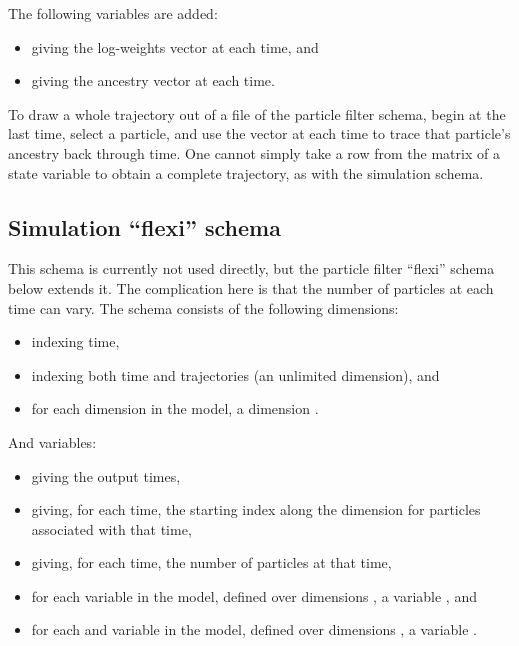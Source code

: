 The following variables are added:
\begin{itemize}
\item {} giving the log-weights vector at each time, and
\item {} giving the ancestry vector at each time.
\end{itemize}

\begin{tip}
To draw a whole trajectory out of a file of the particle filter schema, begin
at the last time, select a particle, and use the  vector at
each time to trace that particle's ancestry back through time. One cannot
simply take a row from the matrix of a state variable to obtain a complete
trajectory, as with the simulation schema.
\end{tip}

\subsection{Simulation ``flexi'' schema}

This schema is currently not used directly, but the particle filter ``flexi''
schema below extends it. The complication here is that the number of
particles at each time can vary. The schema consists of the following
dimensions:
\begin{itemize}
\item {} indexing time,
\item {} indexing both time and trajectories (an unlimited dimension),
  and
\item for each dimension  in the model, a dimension
  .
\end{itemize}
And variables:
\begin{itemize}
\item {} giving the output times,
\item {} giving, for each time, the starting index along the
   dimension for particles associated with that time,
\item {} giving, for each time, the number of particles at that
  time,
\item for each  variable  in the model,
  defined over dimensions , a variable
  , and
\item for each  and  variable  in the
  model, defined over dimensions , a variable
  .
\end{itemize}

